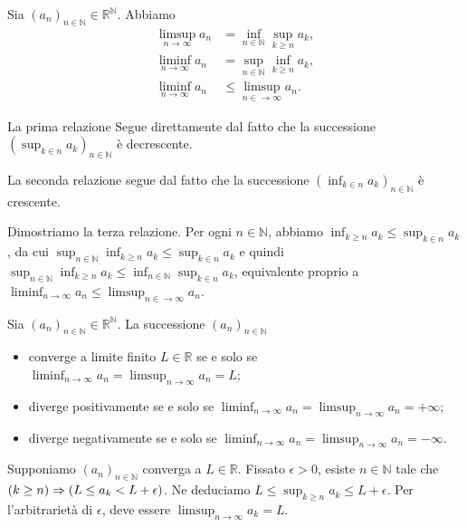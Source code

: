 \begin{Theorem}
  Sia $(a_n)_{n \in \mathbb{N}} \in \mathbb{R}^\mathbb{N}$.
  Abbiamo
  \begin{align*}
    \limsup_{n \rightarrow \infty} a_n
    &= \inf_{n \in \mathbb{N}} \sup_{k \geq n} a_k,\\
    \liminf_{n \rightarrow \infty} a_n
    &= \sup_{n \in \mathbb{N}} \inf_{k \geq n} a_k,\\
    \liminf_{n \rightarrow \infty} a_n
    &\leq \limsup_{n \in \rightarrow \infty} a_n.
  \end{align*}
\end{Theorem}
\Proof La prima relazione Segue direttamente dal fatto che la successione
$(\sup_{k \in n} a_k)_{n \in \mathbb{N}}$
\`e decrescente.
\par La seconda relazione segue dal fatto che la successione
$(\inf_{k \in n} a_k)_{n \in \mathbb{N}}$ \`e
crescente.
\par Dimostriamo la terza relazione. Per ogni $n \in \mathbb{N}$, abbiamo
$\inf_{k \geq n} a_k \leq \sup_{k \in n} a_k$,
da cui
$\sup_{n \in \mathbb{N}} \inf_{k \geq n} a_k \leq \sup_{k \in n} a_k$
e quindi
$\sup_{n \in \mathbb{N}} \inf_{k \geq n} a_k
\leq \inf_{n \in \mathbb{N}} \sup_{k \in n} a_k$,
equivalente proprio a
$\liminf_{n \rightarrow \infty} a_n
\leq \limsup_{n \in \rightarrow \infty} a_n$. \EndProof
\begin{Theorem}
  Sia $(a_n)_{n \in \mathbb{N}} \in \mathbb{R}^\mathbb{N}$.
  La successione $(a_n)_{n \in \mathbb{N}}$
  \begin{itemize}
    \item converge a limite finito $L \in \mathbb{R}$ se e solo se
    $\liminf_{n \rightarrow \infty} a_n
      = \limsup_{n \rightarrow \infty} a_n = L$;
    \item diverge positivamente se e solo se
    $\liminf_{n \rightarrow \infty} a_n
      = \limsup_{n \rightarrow \infty} a_n = + \infty$;
    \item diverge negativamente se e solo se
    $\liminf_{n \rightarrow \infty} a_n
      = \limsup_{n \rightarrow \infty} a_n = - \infty$.
  \end{itemize}
\end{Theorem}
\Proof Supponiamo $(a_n)_{n \in \mathbb{N}}$ converga a $L \in \mathbb{R}$.
Fissato $\epsilon > 0$, esiste $n \in \mathbb{N}$ tale che
$\left ( k \geq n \right ) \Rightarrow \left ( L \leq a_k < L + \epsilon \right )$.
Ne deduciamo
$L \leq \sup_{k \geq n} a_k \leq L + \epsilon$.
Per l'arbitrariet\`a di $\epsilon$, deve essere
$\limsup_{n \rightarrow \infty} a_k = L$.

